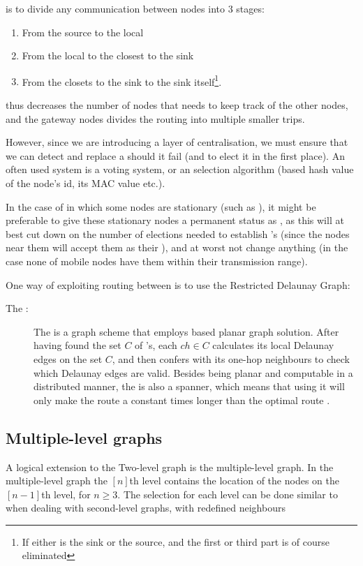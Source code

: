 \ch is to divide any communication between nodes into 3 stages:
\begin{enumerate}
\item From the source to the local \ch 
\item From the local \ch to the \ch closest to the sink
\item From the \ch closets to the sink to the sink itself\footnote{If either \ch is the sink or the source, and the first or third part is of course eliminated}.
\end{enumerate}
 \ch thus decreases the number of nodes that needs to keep track of the other nodes, and the gateway nodes divides the routing into multiple smaller trips.  

However, since we are introducing a layer of centralisation, we must ensure that we can detect and replace a \ch should it fail (and to elect it in the first place). An often used system is a voting system, or an selection algorithm (based hash value of the node's id, its MAC value etc.).

In the case of \manet in which some nodes are stationary (such as \cite{two-tier}), it might be preferable to give these stationary nodes a permanent status as \ch, as this will at best cut down on the number of elections needed to establish \ch's (since the nodes near them will accept them as their \ch), and at worst not change anything (in the case none of mobile nodes have them within their transmission range).

One way of exploiting routing between \ch is to use the Restricted Delaunay Graph:
\begin{description}
\item[The \rdg:] The \rdg is a graph scheme that employs \ch based planar graph solution. After having found the set $C$ of \ch's, each $ch \in C$ calculates its local Delaunay edges on the set $C$, and then confers with its one-hop \ch neighbours to check which Delaunay edges are valid. Besides being planar and computable in a distributed manner, the \rdg is also a spanner, which means that using it will only make the route a constant times longer than the optimal route \cite{GeoSpanners}.
\end{description}

\subsection{Multiple-level graphs}
A logical extension to the Two-level graph is the multiple-level graph. In the multiple-level graph the $[n]$th level contains the location of the nodes on the $[n-1]$th level, for $n \geq 3$. The selection for each level can be done similar to when dealing with second-level graphs, with redefined neighbours    

